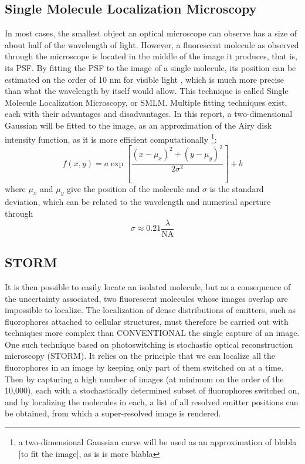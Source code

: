 \subsection{Single Molecule Localization Microscopy} \label{sec:SMLM}
In most cases, the smallest object an optical microscope can observe has a size of about half of the wavelength of light. However, a fluorescent molecule as observed through the microscope is located in the middle of the image it produces, that is, its PSF. By fitting the PSF to the image of a single molecule, its position can be estimated on the order of 10 nm for visible light \cite{douglass_notice_2023}, which is much more precise than what the wavelength by itself would allow. This technique is called Single Molecule Localization Microscopy, or SMLM. Multiple fitting techniques exist, each with their advantages and disadvantages. In this report, a two-dimensional Gaussian will be fitted to the image, as an approximation of the Airy disk intensity function, as it is more efficient \vbox{computationally \cite{douglass_notice_2023}\footnote{a two-dimensional Gaussian curve will be used as an approximation of blabla [to fit the image], as is is more blabla}:}
\begin{equation}
    f(x, y) = a \exp \left[ \frac{(x-\mu_x)^2 + (y-\mu_y)^2}{2 \sigma^2} \right] + b
\end{equation}
where $\mu_x$ and $\mu_y$ give the position of the molecule and $\sigma$ is the standard deviation, which can be related to the wavelength and numerical aperture through \cite{zhang-appliedoptics-2007}
\begin{equation}
    \sigma \approx 0.21 \frac{\lambda}{\textrm{NA}}
    \label{eq:PSF_width_gaussian}
\end{equation}


\subsection{STORM} \label{sec:STORM}
It is then possible to easily locate an isolated molecule, but as a consequence of the uncertainty associated, two fluorescent molecules whose images overlap are impossible to localize.
The localization of dense distributions of emitters, such as fluorophores attached to cellular structures, must therefore be carried out with techniques more complex than CONVENTIONAL the single capture of an image.
One such technique based on photoswitching is stochastic optical reconstruction microscopy (STORM).
It relies on the principle that we can localize all the fluorophores in an image by keeping only part of them switched on at a time.
Then by capturing a high number of images (at minimum on the order of the 10,000), each with a stochastically determined subset of fluorophores switched on, and by localizing the molecules in each, a list of all resolved emitter positions can be obtained, from which a super-resolved image is rendered.

